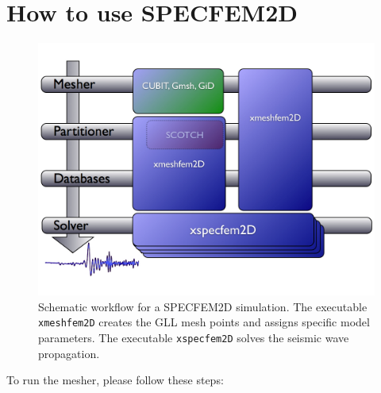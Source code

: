 \documentclass[oneside,english,onecolumn,letterpaper]{book}
\begin{document}

\section{How to use SPECFEM2D}

\begin{figure}[htbp]
\noindent \begin{centering}
\includegraphics[width=.6\textwidth]{figures/workflow.jpg}
\par\end{centering}

\caption{Schematic workflow for a SPECFEM2D simulation. The executable \texttt{xmeshfem2D} creates the GLL mesh points and assigns specific model parameters. The executable \texttt{xspecfem2D} solves the seismic wave propagation.}

\label{fig:workflow.databases}
\end{figure}


\noindent
To run the mesher, please follow these steps:
\end{document}
